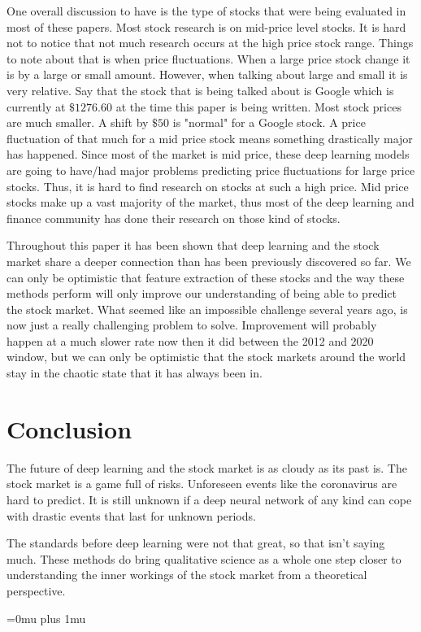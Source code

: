 \documentclass{article}
\theoremstyle{plain}
\theoremstyle{definition}
\numberwithin{equation}{section}
\numberwithin{theorem}{section}
\numberwithin{lemma}{section}
\numberwithin{definition}{section}
\numberwithin{proposition}{section}
\numberwithin{corollary}{section}
\begin{document}
	
	One overall discussion to have is the type of stocks that were being evaluated in most of these papers. Most stock research is on mid-price level stocks. It is hard not to notice that not much research occurs at the high price stock range. Things to note about that is when price fluctuations. When a large price stock change it is by a large or small amount. However, when talking about large and small it is very relative. Say that the stock that is being talked about is Google which is currently at $\$1276.60$ at the time this paper is being written. Most stock prices are much smaller. A shift by $\$50$ is "normal" for a Google stock. A price fluctuation of that much for a mid price stock means something drastically major has happened. Since most of the market is mid price, these deep learning models are going to have/had major problems predicting price fluctuations for large price stocks. Thus, it is hard to find research on stocks at such a high price. Mid price stocks make up a vast majority of the market, thus most of the deep learning and finance community has done their research on those kind of stocks. 
	
	
	Throughout this paper it has been shown that deep learning and the stock market share a deeper connection than has been previously discovered so far. We can only be optimistic that feature extraction of these stocks and the way these methods perform will only improve our understanding of being able to predict the stock market. What seemed like an impossible challenge several years ago, is now just a really challenging problem to solve. Improvement will probably happen at a much slower rate now then it did between the 2012 and 2020 window, but we can only be optimistic that the stock markets around the world stay in the chaotic state that it has always been in.
	
	\section{Conclusion}
	The future of deep learning and the stock market is as cloudy as its past is. The stock market is a game full of risks. Unforeseen events like the coronavirus are hard to predict. It is still unknown if a deep neural network of any kind can cope with drastic events that last for unknown periods. 
	
	
	The standards before deep learning were not that great, so that isn't saying much. These methods do bring qualitative science as a whole one step closer to understanding the inner workings of the stock market from a theoretical perspective.
	
	\Urlmuskip=0mu plus 1mu \relax
	
	
	
	
	
\end{document}
